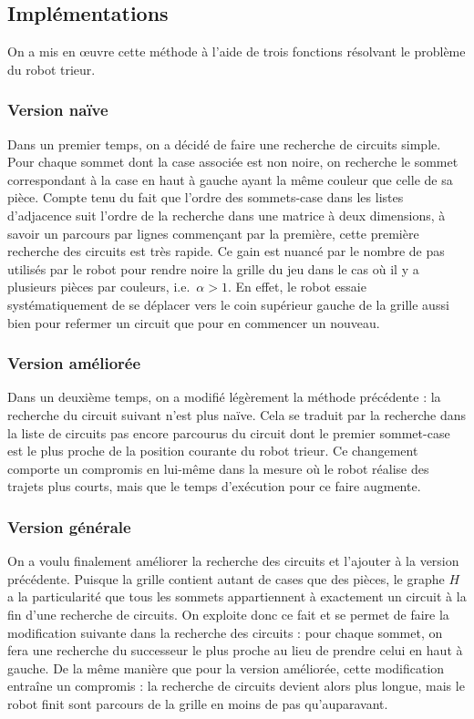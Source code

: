 \documentclass[12pt,a4paper]{article}
\begin{document}
\subsection*{Impl\'ementations}
On a mis en \oe uvre cette m\'ethode \`a l'aide de trois fonctions r\'esolvant 
le probl\`eme du robot trieur.

\subsubsection*{Version na\"ive}
Dans un premier temps, on a d\'ecid\'e de faire une recherche de circuits 
simple. 
Pour chaque sommet dont la case associ\'ee est non noire, on recherche le sommet 
correspondant \`a la case en haut \`a gauche ayant la m\^eme couleur que celle 
de sa pi\`ece. Compte tenu du fait que l'ordre des sommets-case dans les listes 
d'adjacence suit l'ordre de la recherche dans une matrice \`a deux dimensions, 
\`a savoir un parcours par lignes commen\c{c}ant par la premi\`ere, cette 
premi\`ere recherche des circuits est tr\`es rapide. Ce gain est nuanc\'e par le 
nombre de pas utilis\'es par le robot pour rendre noire la grille du jeu dans le 
cas o\`u il y a plusieurs pi\`eces par couleurs, i.e.\ $\alpha > 1$. En effet, 
le robot essaie syst\'ematiquement de se d\'eplacer vers le coin sup\'erieur 
gauche de la grille aussi bien pour refermer un circuit que pour en 
commencer un nouveau.

\subsubsection*{Version am\'elior\'ee}
Dans un deuxi\`eme temps, on a modifi\'e l\'eg\`erement la m\'ethode 
pr\'ec\'edente : la recherche du circuit suivant n'est plus na\"ive. Cela se 
traduit par la recherche dans la liste de circuits pas encore parcourus du 
circuit dont le premier sommet-case est le plus proche de la position courante 
du robot trieur. Ce changement comporte un compromis en lui-m\^eme dans la 
mesure o\`u le robot r\'ealise des trajets plus courts, mais que le temps 
d'ex\'ecution pour ce faire augmente.

\subsubsection*{Version g\'en\'erale}
On a voulu finalement am\'eliorer la recherche des circuits et l'ajouter \`a la 
version pr\'ec\'edente. Puisque la grille contient autant de cases que des 
pi\`eces, le graphe $H$ a la particularit\'e que tous les sommets appartiennent 
\`a exactement un circuit \`a la fin d'une recherche de circuits. On exploite 
donc ce fait et se permet de faire la modification suivante dans la recherche 
des circuits : pour chaque sommet, on fera une recherche du successeur le plus 
proche au lieu de prendre celui en haut \`a gauche. De la m\^eme mani\`ere que 
pour la version am\'elior\'ee, cette modification entra\^ine un compromis : la 
recherche de circuits devient alors plus longue, mais le robot finit sont 
parcours de la grille en moins de pas qu'auparavant.
\end{document}
